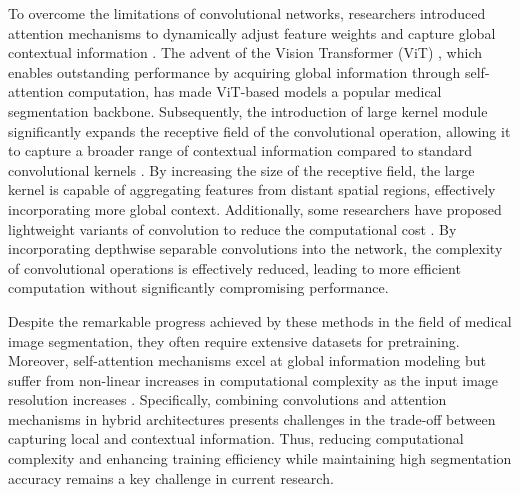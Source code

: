\documentclass[sn-mathphys-num]{sn-jnl}
\theoremstyle{thmstyleone}%
\theoremstyle{thmstyletwo}%
\theoremstyle{thmstylethree}%
\begin{document}
To overcome the limitations of convolutional networks, researchers introduced attention mechanisms to dynamically adjust feature weights and capture global contextual information \cite{nie2018asdnet}.
The advent of the Vision Transformer (ViT) \cite{dosovitskiy2020image}, which enables outstanding performance by acquiring global information through self-attention computation, has made ViT-based models \cite{chen2021transunet,wang2022uctransnet} a popular medical segmentation backbone.
Subsequently, the introduction of large kernel module significantly expands the receptive field of the convolutional operation, allowing it to capture a broader range of contextual information compared to standard convolutional kernels \cite{ding2021repvgg}.
By increasing the size of the receptive field, the large kernel is capable of aggregating features from distant spatial regions, effectively incorporating more global context.
Additionally, some researchers have proposed lightweight variants of convolution to reduce the computational cost \cite{howard2017mobilenets}.
By incorporating depthwise separable convolutions into the network, the complexity of convolutional operations is effectively reduced, leading to more efficient computation without significantly compromising performance.

Despite the remarkable progress achieved by these methods in the field of medical image segmentation, they often require extensive datasets for pretraining.
Moreover, self-attention mechanisms excel at global information modeling but suffer from non-linear increases in computational complexity as the input image resolution increases \cite{DBLP:journals/corr/abs-2312-00752}.
Specifically, combining convolutions and attention mechanisms in hybrid architectures presents challenges in the trade-off between capturing local and contextual information.
Thus, reducing computational complexity and enhancing training efficiency while maintaining high segmentation accuracy remains a key challenge in current research.
\end{document}
